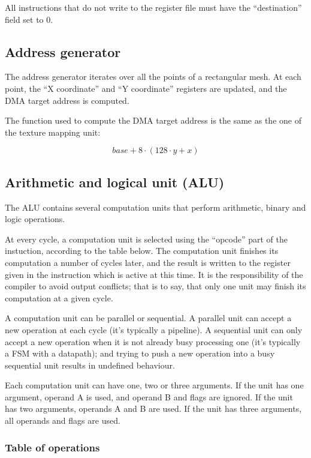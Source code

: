 \documentclass[a4paper,11pt]{article}
\begin{document}
All instructions that do not write to the register file must have the ``destination'' field set to 0.

\subsection{Address generator}
The address generator iterates over all the points of a rectangular mesh. At each point, the ``X coordinate'' and ``Y coordinate'' registers are updated, and the DMA target address is computed.

The function used to compute the DMA target address is the same as the one of the texture mapping unit:

\begin{equation*}
base + 8 \cdot (128 \cdot y + x)
\end{equation*}

\subsection{Arithmetic and logical unit (ALU)}
The ALU contains several computation units that perform arithmetic, binary and logic operations.

At every cycle, a computation unit is selected using the ``opcode'' part of the instuction, according to the table below. The computation unit finishes its computation a number of cycles later, and the result is written to the register given in the instruction which is active at this time. It is the responsibility of the compiler to avoid output conflicts; that is to say, that only one unit may finish its computation at a given cycle.

A computation unit can be parallel or sequential. A parallel unit can accept a new operation at each cycle (it's typically a pipeline). A sequential unit can only accept a new operation when it is not already busy processing one (it's typically a FSM with a datapath); and trying to push a new operation into a busy sequential unit results in undefined behaviour.

Each computation unit can have one, two or three arguments. If the unit has one argument, operand A is used, and operand B and flags are ignored. If the unit has two arguments, operands A and B are used. If the unit has three arguments, all operands and flags are used.

\subsubsection{Table of operations}
\end{document}
